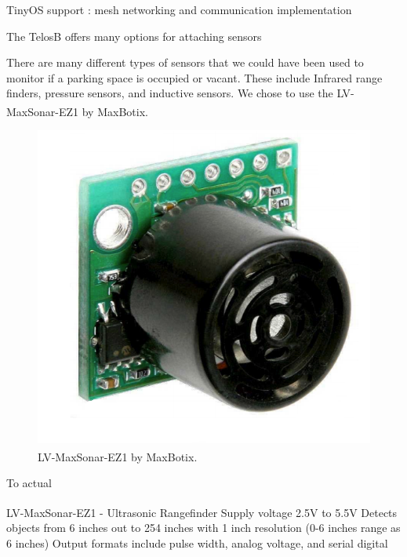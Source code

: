 \documentclass{acm_proc}
\begin{document}
TinyOS support : mesh networking and communication implementation

The TelosB offers many options for attaching sensors 

There are many different types of sensors that we could have been used to monitor if a parking space is occupied or vacant.  These include Infrared range finders, pressure sensors, and inductive sensors.  We chose to use the LV-MaxSonar\textsuperscript{\textregistered}-EZ1\textsuperscript{\texttrademark} by MaxBotix\textsuperscript{\textregistered}.

\begin{figure}[h]
    \begin{center}
		\includegraphics[width=\columnwidth]{figures/range_finder}
	\end{center}
	\caption{LV-MaxSonar\textsuperscript{\textregistered}-EZ1\textsuperscript{\texttrademark} by MaxBotix\textsuperscript{\textregistered}.}
	\label{fig:range_finder}
\end{figure}

To actual

LV-MaxSonar\textsuperscript{\textregistered}-EZ1\textsuperscript{\texttrademark} - Ultrasonic Rangefinder
Supply voltage 2.5V to 5.5V
Detects objects from 6 inches out to 254 inches with 1 inch resolution (0-6 inches range as 6 inches)
Output formats include pulse width, analog voltage, and serial digital
\end{document}
